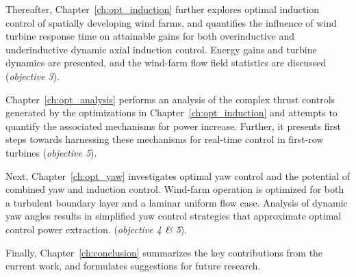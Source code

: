 Thereafter, Chapter~\ref{ch:opt_induction} further explores optimal induction control of spatially developing wind farms, and quantifies the influence of wind turbine response time on attainable gains for both overinductive and underinductive dynamic axial induction control. Energy gains and turbine dynamics are presented, and the wind-farm flow field statistics are discussed (\emph{objective 3}).

Chapter~\ref{ch:opt_analysis} performs an analysis of the complex thrust controls generated by the optimizations in Chapter~\ref{ch:opt_induction} and attempts to quantify the associated mechanisms for power increase. Further, it presents first steps towards harnessing these mechanisms for real-time control in first-row turbines (\emph{objective 5}).

Next, Chapter~\ref{ch:opt_yaw} investigates optimal yaw control and the potential of combined yaw and induction control. Wind-farm operation is optimized for both a turbulent boundary layer and a laminar uniform flow case. Analysis of dynamic yaw angles results in simplified yaw control strategies that approximate optimal control power extraction. (\emph{objective 4 \& 5}). 

Finally, Chapter~\ref{ch:conclusion} summarizes the key contributions from the current work, and formulates suggestions for future research. 


\cleardoublepage


